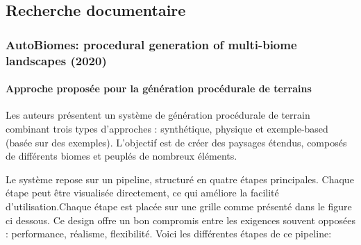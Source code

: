 
\subsection{Recherche documentaire}
\subsubsection{AutoBiomes: procedural generation of multi-biome landscapes (2020)}

    
    \paragraph{Approche proposée pour la génération procédurale de terrains}
    Les auteurs présentent un système de génération procédurale de terrain combinant trois types d’approches : synthétique, physique et exemple-based (basée sur des exemples). L’objectif est de créer des paysages étendus, composés de différents biomes et peuplés de nombreux éléments.
    
    Le système repose sur un pipeline, structuré en quatre étapes principales. Chaque étape peut être visualisée directement, ce qui améliore la facilité d’utilisation.Chaque étape est placée sur une grille comme présenté dans le figure ci dessous. Ce design offre un bon compromis entre les exigences souvent opposées : performance, réalisme, flexibilité. Voici les différentes étapes de ce pipeline:

